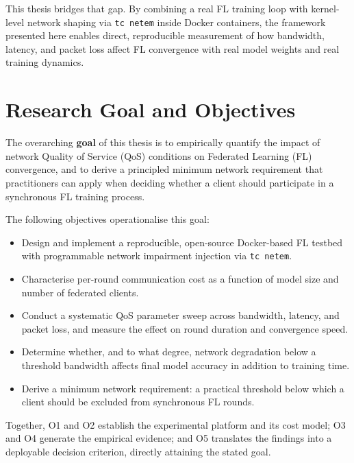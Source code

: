 \documentclass[12pt,a4paper]{report}
\begin{document}
This thesis bridges that gap. By combining a real FL training loop with kernel-level
network shaping via \texttt{tc netem} inside Docker containers, the framework presented
here enables direct, reproducible measurement of how bandwidth, latency, and packet
loss affect FL convergence with real model weights and real training dynamics.

\chapter{Research Goal and Objectives}
\label{ch:goals}

The overarching \textbf{goal} of this thesis is to empirically quantify the
impact of network Quality of Service (QoS) conditions on Federated Learning
(FL) convergence, and to derive a principled minimum network requirement that
practitioners can apply when deciding whether a client should participate in a
synchronous FL training process.

The following objectives operationalise this goal:

\begin{itemize}
  \item[\textbf{O1.}] Design and implement a reproducible, open-source
        Docker-based FL testbed with programmable network impairment injection
        via \texttt{tc netem}.
  \item[\textbf{O2.}] Characterise per-round communication cost as a function
        of model size and number of federated clients.
  \item[\textbf{O3.}] Conduct a systematic QoS parameter sweep across
        bandwidth, latency, and packet loss, and measure the effect on round
        duration and convergence speed.
  \item[\textbf{O4.}] Determine whether, and to what degree, network
        degradation below a threshold bandwidth affects final model accuracy in
        addition to training time.
  \item[\textbf{O5.}] Derive a minimum network requirement: a practical
        threshold below which a client should be excluded from synchronous FL
        rounds.
\end{itemize}

Together, O1 and O2 establish the experimental platform and its cost model;
O3 and O4 generate the empirical evidence; and O5 translates the findings into
a deployable decision criterion, directly attaining the stated goal.
\end{document}
